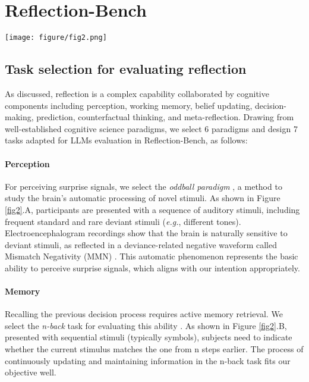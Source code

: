 \section{Reflection-Bench}

\begin{figure*}
\centering
\texttt{[image: figure/fig2.png]}
\caption{Tasks in Reflection-Bench. A: Oddball paradigm. B: N-back (2-back). C: Probabilistic reversal learning task. D: Wisconsin card sorting test. E: Weather prediction task. F: Iowa gambling test. G: Meta-bandit task. }
\label{fig2}
\end{figure*}
\subsection{Task selection for evaluating reflection}
As discussed, reflection is a complex capability collaborated by cognitive components including perception, working memory, belief updating, decision-making, prediction, counterfactual thinking, and meta-reflection. Drawing from well-established cognitive science paradigms, we select 6 paradigms and design 7 tasks adapted for LLMs evaluation in Reflection-Bench, as follows:

\paragraph{Perception} For perceiving surprise signals, we select the \textit{oddball paradigm} \cite{naatanen2007mismatch}, a method to study the brain's automatic processing of novel stimuli. As shown in Figure \ref{fig2}.A, participants are presented with a sequence of auditory stimuli, including frequent standard and rare deviant stimuli (\emph{e.g.}, different tones). Electroencephalogram recordings show that the brain is naturally sensitive to deviant stimuli, as reflected in a deviance-related negative waveform called Mismatch Negativity (MMN) \cite{garrido2009mismatch}. This automatic phenomenon represents the basic ability to perceive surprise signals, which aligns with our intention appropriately.

\paragraph{Memory} Recalling the previous decision process requires active memory retrieval. We select the \textit{n-back} task for evaluating this ability \cite{jaeggi2010concurrent}. As shown in Figure \ref{fig2}.B, presented with sequential stimuli (typically symbols), subjects need to indicate whether the current stimulus matches the one from n steps earlier. The process of continuously updating and maintaining information in the n-back task fits our objective well.

